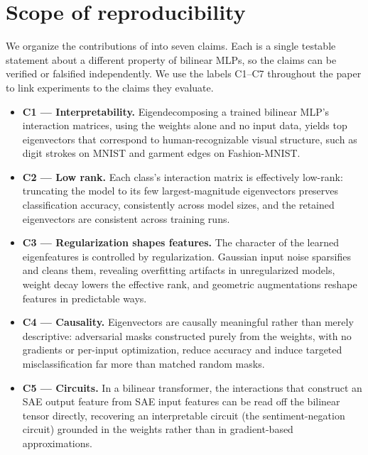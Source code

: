 \documentclass[10pt]{article} %
\begin{document}
\section{Scope of reproducibility}
\label{sec:scope}

We organize the contributions of \citet{pearce2025bilinear} into seven claims. Each is
a single testable statement about a different property of bilinear MLPs, so the claims
can be verified or falsified independently. We use the labels C1--C7 throughout the
paper to link experiments to the claims they evaluate.

\begin{itemize}
\item \textbf{C1 --- Interpretability.} Eigendecomposing a trained bilinear MLP's
interaction matrices, using the weights alone and no input data, yields top
eigenvectors that correspond to human-recognizable visual structure, such as digit
strokes on MNIST and garment edges on Fashion-MNIST.

\item \textbf{C2 --- Low rank.} Each class's interaction matrix is effectively
low-rank: truncating the model to its few largest-magnitude eigenvectors preserves
classification accuracy, consistently across model sizes, and the retained
eigenvectors are consistent across training runs.

\item \textbf{C3 --- Regularization shapes features.} The character of the learned
eigenfeatures is controlled by regularization. Gaussian input noise sparsifies and
cleans them, revealing overfitting artifacts in unregularized models, weight decay
lowers the effective rank, and geometric augmentations reshape features in
predictable ways.

\item \textbf{C4 --- Causality.} Eigenvectors are causally meaningful rather than
merely descriptive: adversarial masks constructed purely from the weights, with no
gradients or per-input optimization, reduce accuracy and induce targeted
misclassification far more than matched random masks.

\item \textbf{C5 --- Circuits.} In a bilinear transformer, the interactions that
construct an SAE output feature from SAE input features can be read off the bilinear
tensor directly, recovering an interpretable circuit (the sentiment-negation circuit)
grounded in the weights rather than in gradient-based approximations.


\end{itemize}
\end{document}
